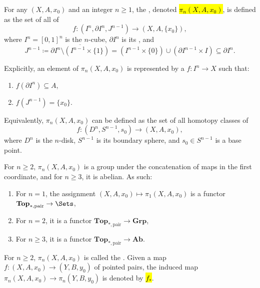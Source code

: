 \begin{definition} \label{definition:relative_homotopy_groups_of_pointed_pairs_of_topological_spaces}
    For any  $(X,A,x_0)$ and an integer $n \ge 1$, the , denoted \hl{$\pi_n(X,A,x_0)$}, is defined as the set of all  of 
    $$f : (I^n, \partial I^n, J^{n-1}) \to (X, A, \{x_0\}),$$
    where $I^n = [0,1]^n$ is the $n$-cube, $\partial I^n$ is its , and 
    $$J^{n-1} \coloneqq \overline{\partial I^n \setminus (I^{n-1} \times \{1\})} = (I^{n-1} \times \{0\}) \cup (\partial I^{n-1} \times I) \subseteq \partial I^n.$$
    
    Explicitly, an element of $\pi_n(X,A,x_0)$ is represented by a  $f : I^n \to X$ such that:
    \begin{enumerate}
        \item $f(\partial I^n) \subseteq A$,
        \item $f(J^{n-1}) = \{x_0\}$.
    \end{enumerate}

    Equivalently, $\pi_n(X,A,x_0)$ can be defined as the set of all homotopy classes of 
    $$f : (D^n, S^{n-1}, s_0) \to (X, A, x_0),$$
    where $D^n$ is the $n$-disk, $S^{n-1}$ is its boundary sphere, and $s_0 \in S^{n-1}$ is a base point.

    For $n \ge 2$, $\pi_n(X,A,x_0)$ is a group under the concatenation of maps in the first coordinate, and for $n \ge 3$, it is abelian. As such:
    \begin{enumerate}
        \item For $n = 1$, the assignment $(X,A,x_0) \mapsto \pi_1(X,A,x_0)$ is a functor $\mathbf{Top}_{*, \text{pair}} \to \Sets$,
        \item For $n = 2$, it is a functor $\mathbf{Top}_{*, \text{pair}} \to \mathbf{Grp}$,
        \item For $n \ge 3$, it is a functor $\mathbf{Top}_{*, \text{pair}} \to \mathbf{Ab}$.
    \end{enumerate}
    
    For $n \ge 2$, $\pi_n(X,A,x_0)$ is called the . Given a map $f: (X,A,x_0) \to (Y,B,y_0)$ of pointed pairs, the induced map $\pi_n(X,A,x_0) \to \pi_n(Y,B,y_0)$ is denoted by \hl{$f_*$}.
\end{definition}